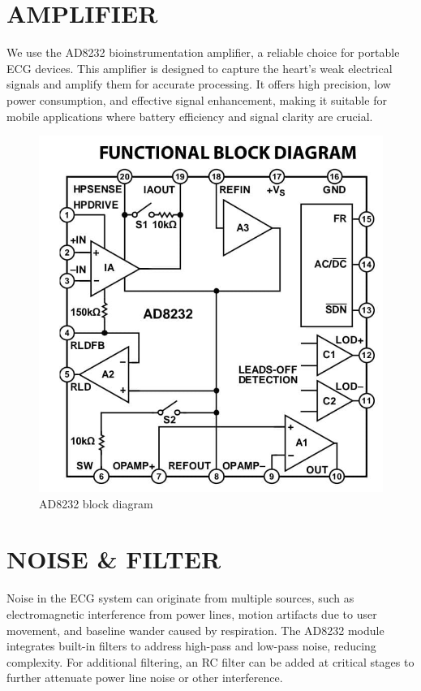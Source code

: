 \section{AMPLIFIER}
We use the AD8232\cite{AD8232} bioinstrumentation amplifier, a reliable choice for portable ECG devices. This amplifier is designed to capture the heart’s weak electrical signals and amplify them for accurate processing. It offers high precision, low power consumption, and effective signal enhancement, making it suitable for mobile applications where battery efficiency and signal clarity are crucial.
\begin{figure}[H]
    \centering
    \includegraphics[scale=0.3]{images/ad8232_block.jpg}
    \caption{AD8232 block diagram\cite{AD8232}}
    \label{fig:AD8232_block}
\end{figure}

\section{NOISE \& FILTER}
Noise in the ECG system can originate from multiple sources, such as electromagnetic interference from power lines, motion artifacts due to user movement, and baseline wander caused by respiration. The AD8232 module integrates built-in filters to address high-pass and low-pass noise, reducing complexity. For additional filtering, an RC filter can be added at critical stages to further attenuate power line noise or other interference\cite{Tayal2018}.


